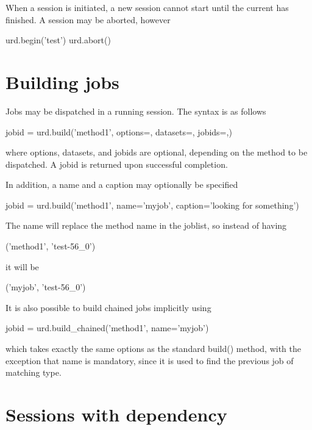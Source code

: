 When a session is initiated, a new session cannot start until the
current has finished.  A session may be aborted, however

\begin{python}
  urd.begin('test')
  urd.abort()
\end{python}



\section{Building jobs}

Jobs may be dispatched in a running session.  The syntax is as follows

\begin{python}
  jobid = urd.build('method1', options={}, datasets={}, jobids={},)
\end{python}
where options, datasets, and jobids are optional, depending on the
method to be dispatched.  A jobid is returned upon successful
completion.

In addition, a name and a caption may optionally be specified

\begin{python}
  jobid = urd.build('method1', name='myjob', caption='looking for something')
\end{python}

The name will replace the method name in the joblist, so instead of
having

\begin{python}
  ('method1', 'test-56_0')
\end{python}
it will be

\begin{python}
  ('myjob', 'test-56_0')
\end{python}



It is also possible to build chained jobs implicitly using

\begin{python}
  jobid = urd.build_chained('method1', name='myjob')
\end{python}
which takes exactly the same options as the standard build() method,
with the exception that name is mandatory, since it is used to find
the previous job of matching type.



\section{Sessions with dependency}



